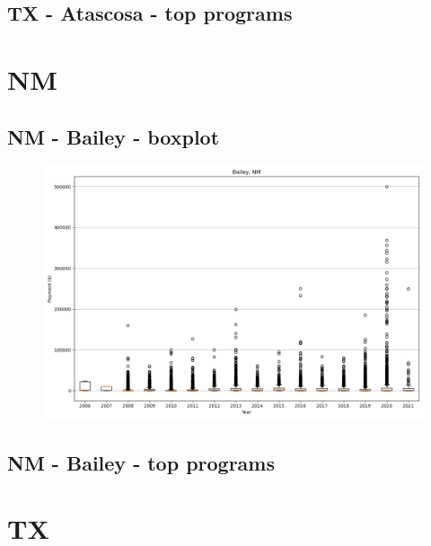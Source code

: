 \subsection*{TX - Atascosa - top programs}

\newpage
\section*{NM}
\subsection*{NM - Bailey - boxplot}
\begin{figure}[h]
\centering
\includegraphics[width=7in]{../output/boxplots/counties/Bailey-NM_boxplot.png}
\end{figure}


\subsection*{NM - Bailey - top programs}

\newpage
\section*{TX}
